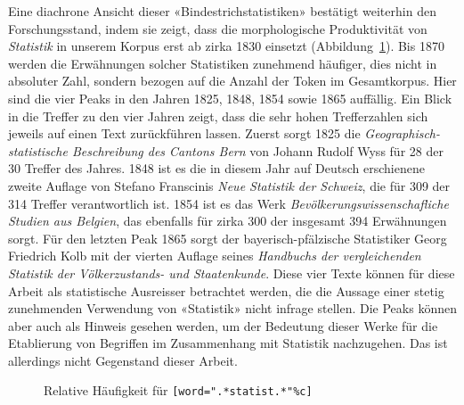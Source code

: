 Eine diachrone Ansicht dieser «Bindestrichstatistiken» bestätigt weiterhin den Forschungsstand, indem sie zeigt, dass die morphologische Produktivität von \textit{Statistik} in unserem Korpus erst ab zirka 1830 einsetzt (Abbildung~\ref{figure:4-2}). Bis 1870 werden die Erwähnungen solcher Statistiken zunehmend häufiger, dies nicht in absoluter Zahl, sondern bezogen auf die Anzahl der Token im Gesamtkorpus. Hier sind die vier Peaks in den Jahren 1825, 1848, 1854 sowie 1865 auffällig. Ein Blick in die Treffer zu den vier Jahren zeigt, dass die sehr hohen Trefferzahlen sich jeweils auf einen Text zurückführen lassen. Zuerst sorgt 1825 die \textit{Geographisch-statistische Beschreibung des Cantons Bern} von Johann Rudolf Wyss für 28 der 30 Treffer des Jahres. 1848 ist es die in diesem Jahr auf Deutsch erschienene zweite Auflage von Stefano Franscinis \textit{Neue Statistik der Schweiz}, die für 309 der 314 Treffer verantwortlich ist. 1854 ist es das Werk \textit{Bevölkerungswissenschafliche Studien aus Belgien}, das ebenfalls für zirka 300 der insgesamt 394 Erwähnungen sorgt. Für den letzten Peak 1865 sorgt der bayerisch-pfälzische Statistiker Georg Friedrich Kolb mit der vierten Auflage seines \textit{Handbuchs der vergleichenden Statistik der Völkerzustands- und Staatenkunde}. Diese vier Texte können für diese Arbeit als statistische Ausreisser betrachtet werden, die die Aussage einer stetig zunehmenden Verwendung von «Statistik» nicht infrage stellen. Die Peaks können aber auch als Hinweis gesehen werden, um der Bedeutung dieser Werke für die Etablierung von Begriffen im Zusammenhang mit Statistik nachzugehen. Das ist allerdings nicht Gegenstand dieser Arbeit.

\hspace{1cm}

\begin{figure}[!ht]
    \caption{Relative Häufigkeit für \texttt{[word=".*statist.*"\%c]}}
    \label{figure:4-2} 
\end{figure}

